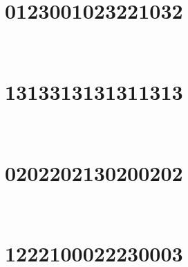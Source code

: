 
\section{0123001023221032}

\marginnote[3\baselineskip]{\centering}



\,
\newline
\vspace{1.2cm}

\section{1313313131311313}

\marginnote[3\baselineskip]{\centering}



\,
\newline
\vspace{1.2cm}

\section{0202202130200202}

\marginnote[3\baselineskip]{\centering}



\,
\newline
\vspace{1.2cm}

\section{1222100022230003}

\marginnote[3\baselineskip]{\centering}



\,
\newline
\vspace{1.2cm}
